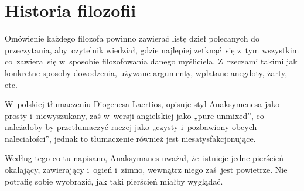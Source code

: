 \documentclass[a4paper,11pt]{article}
\begin{document}
\vspace{\spaceTwo}










\newpage
\section{Historia filozofii}

\vspace{\spaceTwo}






\noi {}

\vspace{\spaceFour}


\start Omówienie każdego filozofa powinno zawierać listę dzieł
polecanych do przeczytania, aby~czytelnik wiedział, gdzie najlepiej
zetknąć~się z~tym wszystkim co~zawiera~się w~sposobie filozofowania
danego myśliciela. Z~rzeczami takimi jak konkretne sposoby dowodzenia,
używane argumenty, wplatane anegdoty, żarty, etc.

\vspace{\spaceThree}


\noi {}

\vspace{\spaceFour}

\start {} W~polskiej tłumaczeniu Diogenesa Laertios, opisuje
styl Anaksymenesa jako prosty i~niewyszukany, zaś w~wersji angielskiej
jako „pure unmixed”, co należałoby by przetłumaczyć raczej jako
„czysty i~pozbawiony obcych naleciałości”, jednak to tłumaczenie
również jest niesatysfakcjonujące.

\vspace{\spaceFour}


\start {} Według tego co tu napisano, Anaksymanes uważał,
że~istnieje jedne pierścień okalający, zawierający i~ogień i~zimno,
wewnątrz niego zaś~jest powietrze. Nie potrafię sobie wyobrazić, jak
taki pierścień miałby wyglądać.

\vspace{\spaceFour}
\end{document}
